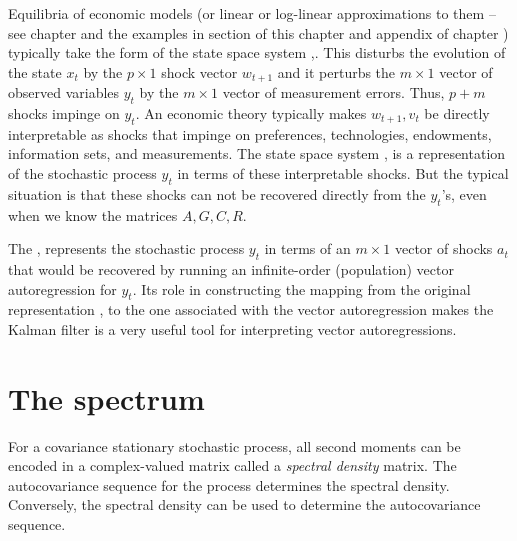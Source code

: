 Equilibria of economic models (or linear or log-linear approximations to them -- see chapter  and the examples
in section  of this chapter and appendix  of chapter )  typically
take the form of the state space system ,.  This    disturbs the evolution of the  state $x_t$
by the $p\times 1 $ shock vector $w_{t+1}$  and it perturbs the $ m \times 1$ vector of observed variables $y_t$
by the $ m \times 1$ vector of measurement errors. Thus,  $p + m$ shocks  impinge on $y_t$.
An economic theory typically makes  $w_{t+1}, v_t$ be directly interpretable as shocks that impinge on preferences, technologies,
endowments, information sets, and measurements.
The state space system  , is a representation of the stochastic process  $y_t$ in terms of these interpretable shocks.
But the typical situation is that these shocks can  not be recovered directly from the $y_t$'s, even when we know the matrices $A, G, C, R$.

The  ,  represents  the %
stochastic process $y_t$
in terms of an $ m \times 1$ vector of shocks $a_t$ that would  be recovered by running an infinite-order (population) vector autoregression
for $y_t$.  Its role in constructing the mapping from the original representation , to the one associated
with the vector autoregression  makes the    Kalman filter is a very useful tool for interpreting vector autoregressions.
%




\section{The spectrum}\label{sec:spectrum}%
 For a covariance stationary stochastic process,  all second moments
can be encoded in a complex-valued matrix called a
{\it spectral density} matrix.  The autocovariance sequence for
the process  determines the spectral density. Conversely,
the spectral density can be used to determine the autocovariance sequence.

